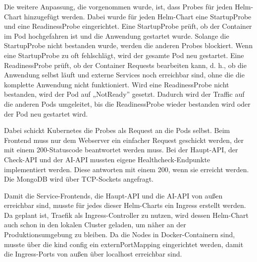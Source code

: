 Die weitere Anpassung, die vorgenommen wurde, ist, dass Probes für jeden Helm-Chart hinzugefügt werden.
Dabei wurde für jeden Helm-Chart eine StartupProbe und eine ReadinessProbe eingerichtet. 
Eine StartupProbe prüft, ob der Container im Pod hochgefahren ist und die Anwendung gestartet wurde. Solange die StartupProbe nicht bestanden wurde, werden die anderen Probes blockiert.
Wenn eine StartupProbe zu oft fehlschlägt, wird der gesamte Pod neu gestartet.
Eine ReadinessProbe prüft, ob der Container Requests bearbeiten kann, d. h., ob die Anwendung selbst läuft und externe Services noch erreichbar sind, ohne die die komplette Anwendung nicht funktioniert.
Wird eine ReadinessProbe nicht bestanden, wird der Pod auf „NotReady” gesetzt. Dadurch wird der Traffic auf die anderen Pods umgeleitet, bis die ReadinessProbe wieder bestanden wird oder der Pod neu gestartet wird.

Dabei schickt Kubernetes die Probes als Request an die Pods selbst.
Beim Frontend muss nur dem Webserver ein einfacher Request geschickt werden, der mit einem 200-Statuscode beantwortet werden muss.
Bei der Haupt-API, der Check-API und der AI-API mussten eigene Healthcheck-Endpunkte implementiert werden. Diese antworten mit einem 200, wenn sie erreicht werden.
Die MongoDB wird über TCP-Sockets angefragt.

Damit die Service-Frontends, die Haupt-API und die AI-API von außen erreichbar sind, musste für jedes dieser Helm-Charts ein Ingress erstellt werden. 
Da geplant ist, Traefik als Ingress-Controller zu nutzen, wird dessen Helm-Chart auch schon in den lokalen Cluster geladen, um näher an der Produktionsumgebung zu bleiben.
Da die Nodes in Docker-Containern sind, musste über die kind config ein externPortMapping eingerichtet werden, damit die Ingress-Ports von außen über localhost erreichbar sind.